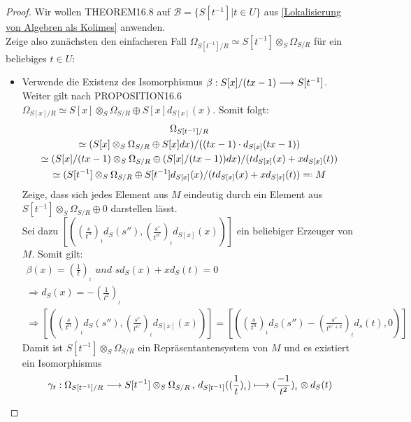 \documentclass[10pt,a4paper]{report}
\newcommand{\comment}[1]{}
\newcommand{\functionfront}[3]{\nolinebreak{#1:#2 \longrightarrow #3}}
\newcommand{\function}[5]{\nolinebreak{#1:#2 \longrightarrow #3 \, , \, #4 \longmapsto #5}}
\newcommand{\divR}[2]{\Omega_{#1/#2}}
\newcommand{\Tensor}[3]{#1 \otimes_{#2} #3}
\newcommand{\tensor}[3]{#1 \otimes #3}
\newcommand{\lok}[2]{#1 [#2^{-1}]}
\newcommand{\loke}[3]{(\frac{#1}{#2})_{_#3}}
\newcommand*{\defeqr}{= \mathrel{\vcenter{\baselineskip0.5ex \lineskiplimit0pt
                     \hbox{\scriptsize.}\hbox{\scriptsize.}}}}
\begin{document}
\begin{proof}
Wir wollen THEOREM16.8 \comment{\label{THEOREM16.8}} auf $\mathcal{B} = \lbrace \lok{S}{t} \vert t \in U \rbrace$ aus \cref{Lokalisierung von Algebren als Kolimes} anwenden.\\
Zeige also zunächsten den einfacheren Fall $\divR{\lok{S}{t}}{R} \simeq \Tensor{\lok{S}{t}}{S}{\divR{S}{R}}$ für ein beliebiges $t \in U$:
\begin{itemize}
\item[]
Verwende die Existenz des Isomorphismus \comment{$\functionfront{\alpha}{\lok{S}{t}}{S[x]/(tx -1)}$ und} $\functionfront{\beta}{S[x]/(tx -1)}{\lok{S}{t}}$. Weiter gilt nach PROPOSITION16.6 \comment{\label{Korrolar16.6}} $\divR{S[x]}{R} \simeq \Tensor{S[x]}{S}{\divR{S}{R}} \oplus S[x]d_{S[x]}(x)$. Somit folgt:
\begin{gather*}
\divR{\lok{S}{t}}{R} \\
 \simeq (\Tensor{S[x]}{S}{\divR{S}{R}} \oplus S[x] dx) / ((tx - 1) \cdot d_{S[x]}(tx - 1)) \\
  \simeq (\Tensor{S[x]/(tx -1)}{S}{\divR{S}{R}} \oplus (S[x]/(tx - 1)) dx) / (td_{S[x]}(x) + xd_{S[x]}(t)) \\
   \simeq (\Tensor{\lok{S}{t}}{S}{\divR{S}{R}} \oplus \lok{S}{t} d_{S[x]}(x) / (td_{S[x]}(x) + xd_{S[x]}(t)) \defeqr M
\end{gather*}
Zeige, dass sich jedes Element aus $M$ eindeutig durch ein Element aus $\Tensor{\lok{S}{t}}{S}{\divR{S}{R}} \oplus 0 $ darstellen lässt.\\
Sei dazu $[(\loke{s}{t^n}{t}d_{S}(s'') , \loke{s'}{t^{n'}}{t}d_{S[x]}(x) )]$ ein beliebiger Erzeuger von $M$. Somit gilt:
\begin{gather*}
\beta(x) = \loke{1}{t}{t} \textit{ und } sd_{S}(x) + xd_{S}(t) = 0 \\
 \Rightarrow d_{S}(x) = -\loke{1}{t^2}{t} \\
  \Rightarrow [(\loke{s}{t^n}{t}d_{S}(s'') , \loke{s'}{t^{n'}}{t}d_{S[x]}(x) )] = [( \loke{s}{t^n}{t}d_{S}(s'') - \loke{s'}{t^{n' +2}}{t} d_{s}(t), 0 )]
\end{gather*}
Damit ist $\Tensor{\lok{S}{t}}{S}{\divR{S}{R}}$ ein Repräsentantensystem von $M$ und es existiert ein Isomorphismus
\begin{gather*}
\function{\gamma_t}{\divR{\lok{S}{t}}{R}}{\Tensor{\lok{S}{t}}{S}{\divR{S}{R}}}{d_{\lok{S}{t}}(\loke{1}{t}{t})}{\tensor{\loke{-1}{t^2}{t}}{S}{d_S(t)}}
\end{gather*}


\comment{
Damit ist $\Tensor{\lok{S}{t}}{S}{\divR{S}{R}}$ ein Repräsentantensystem von $M$ und es gilt:
\begin{gather*} 
\divR{\lok{S}{t}}{R} \comment{\simeq \Tensor{S[x]/(tx -1)}{S}{\divR{S}{R}}} \simeq \Tensor{\lok{S}{t}}{S}{\divR{S}{R}}
\end{gather*}
Sei $\functionfront{\gamma_t}{\divR{\lok{S}{t}}{R}}{\Tensor{\lok{S}{t}}{S}{\divR{S}{R}}}$ ein Isomorphismus (für beliebige $t \in U$).
}
\end{itemize}



\end{proof}
\end{document}
